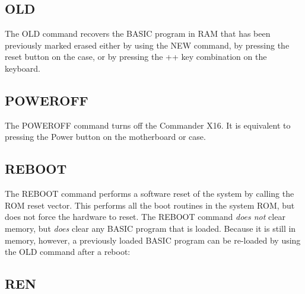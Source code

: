 \subsection{OLD}

 The {\ttfamily OLD} command recovers the BASIC program in RAM that has been
 previously marked erased either by using the {\ttfamily NEW} command, by
 pressing the reset button on the case, or by pressing the
 ++
 key combination on the keyboard.\\

\subsection{POWEROFF}

The {\ttfamily POWEROFF} command turns off the Commander X16.  It is equivalent
to pressing the Power button on the motherboard or case.\\

\subsection{REBOOT}

The {\ttfamily REBOOT} command performs a software reset of the system by
calling the ROM reset vector.  This performs all the boot routines in the
system ROM, but does not force the hardware to reset.  The {\ttfamily REBOOT}
command {\em does not} clear memory, but {\em does} clear any BASIC program
that is loaded.  Because it is still in memory, however, a previously loaded
BASIC program can be re-loaded by using the {\ttfamily OLD} command after a
reboot:\\


\subsection{REN}

